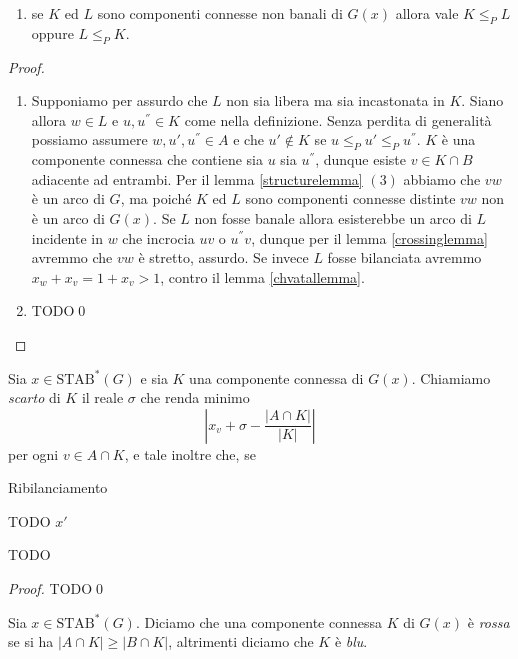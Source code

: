 {\begin{lemma}
\begin{enumerate}
		\item se \(K\) ed \(L\) sono componenti connesse non banali di \(G(x)\) allora vale \(K\le_{P}L\) oppure \(L\le_{P}K\). 
	\end{enumerate}
\end{lemma}
\begin{proof}
	\begin{enumerate}
		\item Supponiamo per assurdo che \(L\) non sia libera ma sia incastonata in \(K\). Siano allora \(w\in L\) e \(u,u^{''}\in K\) come nella definizione. Senza perdita di generalità possiamo assumere \(w,u',u^{''}\in A\) e che \(u'\not\in K\) se \(u\le_{P}u'\le_{P}u^{''}\). \(K\) \`e una componente connessa che contiene sia \(u\) sia \(u^{''}\), dunque esiste \(v\in K\cap B\) adiacente ad entrambi. Per il lemma \ref{structurelemma} \((3)\) abbiamo che \(vw\) \`e un arco di \(G\), ma poich\'e \(K\) ed \(L\) sono componenti connesse distinte \(vw\) non \`e un arco di \(G(x)\). Se \(L\) non fosse banale allora esisterebbe un arco di \(L\) incidente in \(w\) che incrocia \(uv\) o \(u^{''}v\), dunque per il lemma \ref{crossinglemma} avremmo che \(vw\) \`e stretto, assurdo. Se invece \(L\) fosse bilanciata avremmo \(x_w+x_v=1+x_v>1\), contro il lemma \ref{chvatallemma}. 
		\item TODO\qed 
	\end{enumerate}
\end{proof}
\begin{definition}
	Sia \(x\in \text{STAB}^*(G)\) e sia \(K\) una componente connessa di \(G(x)\). Chiamiamo \emph{scarto} di \(K\) il reale \(\sigma\) che renda minimo
	\[\left|x_v+\sigma-\frac{|A\cap K|}{|K|}\right|\]
	per ogni \(v\in A\cap K\), e tale inoltre che, se 
	\begin{cases}
	\end{cases}
\end{definition}
\begin{algorithm}
	\caption{Ribilanciamento} \label{rebalance} 
	\begin{algorithmic}
		[1] \WHILE{} \STATE TODO \ENDWHILE \RETURN \(x'\) 
	\end{algorithmic}
\end{algorithm}
\begin{lemma}
	\label{touchinglemma} TODO 
\end{lemma}
\begin{proof}
	TODO\qed 
\end{proof}
\begin{definition}
	Sia \(x\in\text{STAB}^{*}(G)\). Diciamo che una componente connessa \(K\) di \(G(x)\) è \emph{rossa} se si ha \(|A\cap K|\ge|B\cap K|\), altrimenti diciamo che \(K\) è \emph{blu}. 

\end{definition}}
